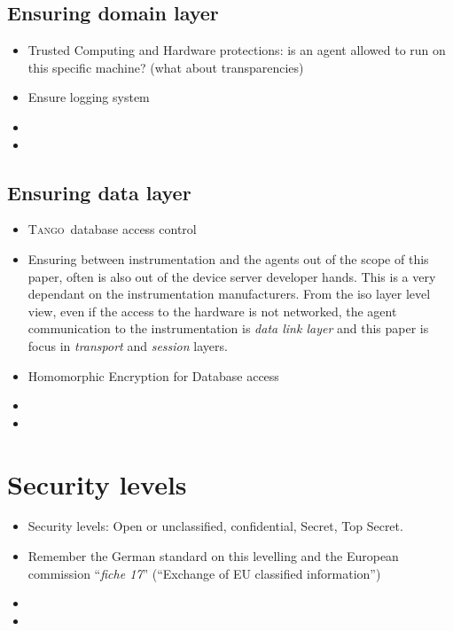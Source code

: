 \documentclass[10pt,a4paper,twoside]{llncs}
\newcommand{\tango}{\textsc{Tango}}
\begin{document}
%
\subsection{Ensuring domain layer \label{sec:domainLayer}}

\begin{itemize}
 \item Trusted Computing and Hardware protections: is an agent allowed to run on this specific machine? (what about transparencies)
 \item Ensure logging system
 \item 
 \item
\end{itemize}

%
\subsection{Ensuring data layer \label{sec:dataLayer}}

\begin{itemize}
 \item \tango\, database access control
 \item Ensuring between instrumentation and the agents out of the scope of this paper, often is also out of the device server developer hands. This is a very dependant on the instrumentation manufacturers. From the iso layer level view, even if the access to the hardware is not networked, the agent communication to the instrumentation is \emph{data link layer} and this paper is focus in \emph{transport} and \emph{session} layers.
 \item Homomorphic Encryption for Database access
 \item  
 \item 
\end{itemize}

%
\section{Security levels \label{sec:secLevel}}

\begin{itemize}
 \item Security levels: Open or unclassified, confidential, Secret, Top Secret.
 \item Remember the German standard on this levelling and the European commission ``\emph{fiche 17}'' (``Exchange of EU classified information'')
 \item
 \item
\end{itemize}
\end{document}
